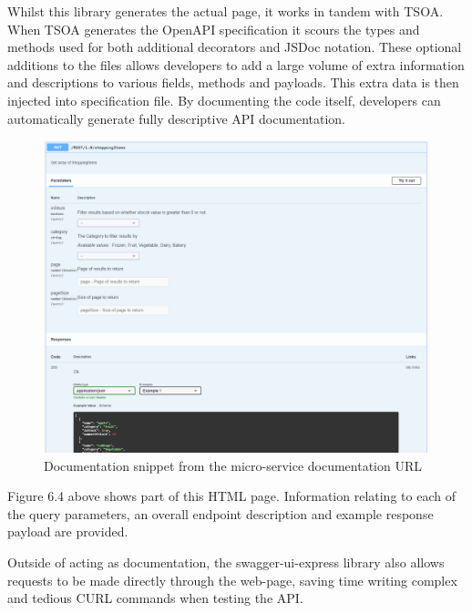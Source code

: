 Whilst this library generates the actual page, it works in tandem with TSOA. When TSOA generates the OpenAPI specification it scours the types and methods used for both additional decorators and JSDoc notation. These optional additions to the files allows developers to add a large volume of extra information and descriptions to various fields, methods and payloads. This extra data is then injected into specification file. By documenting the code itself, developers can automatically generate fully descriptive API documentation.
\begin{figure}[!htb]
\caption{Documentation snippet from the micro-service documentation URL}
\centering
\includegraphics[scale=0.41]{FYP_Dissertation_template/Figures/doc-example.PNG}
\end{figure}
\FloatBarrier
Figure 6.4 above shows part of this HTML page. Information relating to each of the query parameters, an overall endpoint description and example response payload are provided.

Outside of acting as documentation, the swagger-ui-express library also allows requests to be made directly through the web-page, saving time writing complex and tedious CURL commands when testing the API.

